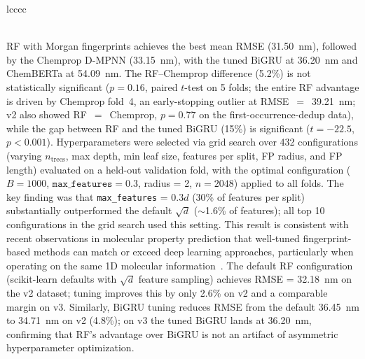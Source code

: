 \documentclass[journal=jcisd8,manuscript=article]{achemso}
\begin{document}
\begin{table}[htbp]
\begin{tabular}{lcccc}
\bottomrule
{} \\
 \\
\end{tabular}
\end{table}

RF with Morgan fingerprints achieves the best mean RMSE (31.50~nm), followed by the Chemprop D-MPNN (33.15~nm), with the tuned BiGRU at 36.20~nm and ChemBERTa at 54.09~nm.
The RF--Chemprop difference (5.2\%) is not statistically significant ($p = 0.16$, paired $t$-test on 5 folds; the entire RF advantage is driven by Chemprop fold~4, an early-stopping outlier at RMSE~$=$~39.21~nm; v2 also showed RF~$=$~Chemprop, $p = 0.77$ on the first-occurrence-dedup data), while the gap between RF and the tuned BiGRU (15\%) is significant ($t = -22.5$, $p < 0.001$).
Hyperparameters were selected via grid search over 432 configurations (varying $n_\text{trees}$, max depth, min leaf size, features per split, FP radius, and FP length) evaluated on a held-out validation fold, with the optimal configuration ($B = 1000$, $\texttt{max\_features} = 0.3$, radius = 2, $n = 2048$) applied to all folds.
The key finding was that \texttt{max\_features} = $0.3d$ (30\% of features per split) substantially outperformed the default $\sqrt{d}$ ($\sim$1.6\% of features); all top 10 configurations in the grid search used this setting.
This result is consistent with recent observations in molecular property prediction that well-tuned fingerprint-based methods can match or exceed deep learning approaches, particularly when operating on the same 1D molecular information~\cite{panapitiya2022evaluation, walters2021applications, fooladi2025evaluating}.
The default RF configuration (scikit-learn defaults with $\sqrt{d}$ feature sampling) achieves RMSE = 32.18~nm on the v2 dataset; tuning improves this by only 2.6\% on v2 and a comparable margin on v3.
Similarly, BiGRU tuning reduces RMSE from the default 36.45~nm to 34.71~nm on v2 (4.8\%); on v3 the tuned BiGRU lands at 36.20~nm, confirming that RF's advantage over BiGRU is not an artifact of asymmetric hyperparameter optimization.
\end{document}
